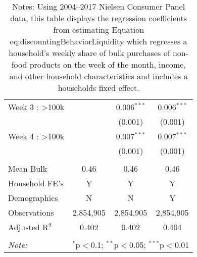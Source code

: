 \begin{table}[!htbp]
\begin{tabular}{@{\extracolsep{5pt}}lccc}
  Week 3 : >100k &  & 0.006$^{***}$ & 0.006$^{***}$ \\
  &  & (0.001) & (0.001) \\
  Week 4 : >100k &  & 0.007$^{***}$ & 0.007$^{***}$ \\
  &  & (0.001) & (0.001) \\
 \hline \\[-1.8ex]
Mean Bulk & 0.46 & 0.46 & 0.46 \\
Household FE's & Y & Y & Y \\
Demographics & N & N & Y \\
Observations & 2,854,905 & 2,854,905 & 2,854,905 \\
Adjusted R$^{2}$ & 0.402 & 0.402 & 0.404 \\
\hline
\hline \\[-1.8ex]
\textit{Note:}  & \multicolumn{3}{l}{$^{*}$p$<$0.1; $^{**}$p$<$0.05; $^{***}$p$<$0.01} \\
\end{tabular}
\caption*{Notes: Using 2004--2017 Nielsen Consumer Panel data, this table displays the regression coefficients from estimating Equation {eq:discountingBehaviorLiquidity} which regresses a household's weekly share of bulk purchases of non-food products on the week of the month, income, and other household characteristics and includes a households fixed effect.}
\end{table}
